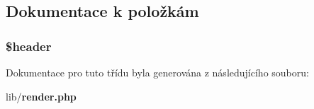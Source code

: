 \subsection{Dokumentace k položkám}
\subsubsection[{\$header}]{\setlength{\rightskip}{0pt plus 5cm}\$header\hspace{0.3cm}{\ttfamily  [private]}}\label{d5/d9e/class_b_head_a4f44601f2b9dc8a1644bce53c94ce622}


Dokumentace pro tuto třídu byla generována z následujícího souboru:\begin{DoxyCompactItemize}
\item 
lib/{\bf render.php}\end{DoxyCompactItemize}
